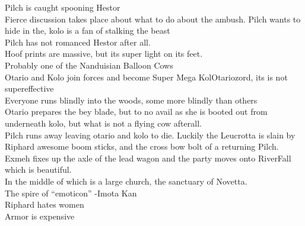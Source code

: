 Pilch is caught spooning Hestor\\
Fierce discussion takes place about what to do about the ambush. Pilch wants to hide in the, kolo is a fan of stalking the beast\\
Pilch has not romanced Hestor after all.\\
Hoof prints are massive, but its super light on its feet.\\
Probably one of the Nanduisian Balloon Cows\\
Otario and Kolo join forces and become Super Mega KolOtariozord, its is not supereffective\\
Everyone runs blindly into the woods, some more blindly than others\\
Otario prepares the bey blade, but to no avail as she is booted out from underneath kolo, but what is not a flying cow afterall.\\
Pilch runs away leaving otario and kolo to die. Luckily the Leucrotta is slain by Riphard awesome boom sticks, and the cross bow bolt of a returning Pilch.\\
Exmeh fixes up the axle of the lead wagon and the party moves onto RiverFall which is beautiful.\\
In the middle of which is a large church, the sanctuary of Novetta.\\
The spire of “emoticon” -Imota Kan\\
Riphard hates women\\
Armor is expensive\\
